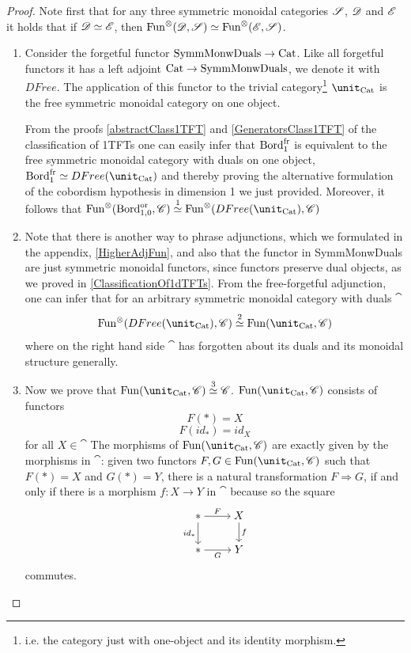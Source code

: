 \begin{proof}
	Note first that for any three symmetric monoidal categories $\mathscr{S}$, $\mathscr{D}$ and $\mathscr{E}$ it holds that if $\mathscr{D}\simeq\mathscr{E}$, then
	$\operatorname{Fun}^{\otimes}(\mathscr{D},\mathscr{S})\simeq\operatorname{Fun}^{\otimes}(\mathscr{E},\mathscr{S})$.
\begin{enumerate}
\item Consider the forgetful functor $\operatorname{SymmMonwDuals}\to\operatorname{Cat}$. Like all forgetful functors it has 
a left adjoint $\operatorname{Cat}\to\operatorname{SymmMonwDuals}$, we denote it with $DFree$.
The application of this functor to the trivial category\footnote{i.e. the category just with one-object and its
	identity morphism.} $\unit_{\Cat}$ is the free symmetric monoidal category on one object.

From the proofs \ref{abstractClass1TFT} and \ref{GeneratorsClass1TFT} of the classification of 1TFTs
one can easily infer that $\operatorname{Bord}_{1}^{\operatorname{fr}}$ is equivalent to the free symmetric monoidal category with duals
on one object,
$\Bord_{1}^{\fr}\simeq DFree(\unit_{\Cat})$
and thereby proving the alternative formulation of the cobordism hypothesis in dimension 1 we just provided. Moreover,
it follows that $\Fun^{\otimes}(\Bord_{1,0}^{\operatorname{or}},\cat)\overset{1}{\simeq}\Fun^{\otimes}(DFree(\unit_{\Cat}),\cat)$

\item Note that there is another way to phrase adjunctions, which we formulated in the appendix, \ref{HigherAdjFun}, and
also that the functor in SymmMonwDuals are just symmetric monoidal functors, since functors preserve dual
objects, as we proved in \ref{ClassificationOf1dTFTs}.
From the free-forgetful adjunction, one can infer that for an arbitrary symmetric monoidal category with duals $\cat$
$$\Fun^\otimes (DFree(\unit_{\Cat}),\cat)\overset{2}{\simeq}\Fun(\unit_{\Cat},\cat)$$
where on the right hand side $\cat$ has forgotten about its duals and its monoidal structure generally. 


\item Now we prove that $\Fun(\unit_{\Cat},\cat)\overset{3}{\simeq} \cat$.
$\Fun(\unit_{\Cat},\cat)$ consists of functors $$F(\ast)=X$$ $$F(id_\ast)=id_X$$ for all $X\in\cat$
The morphisms of $\Fun(\unit_{\Cat},\cat)$ are exactly given by the morphisms in $\cat$:  given two functors
 $F,G\in\Fun(\unit_{\Cat},\cat)$ such that $F(\ast)=X$ and $G(\ast)=Y$,
 there is a natural transformation $F\Rightarrow G$, if and only if
there is a morphism $f:X\to Y$ in $\cat$ because so the square 
\[\begin{tikzcd}[cramped]
	\ast & X \\
	\ast & Y
	\arrow["{id_\ast}"', from=1-1, to=2-1]
	\arrow["F", from=1-1, to=1-2]
	\arrow["G"', from=2-1, to=2-2]
	\arrow["f", from=1-2, to=2-2]
\end{tikzcd}\]
commutes.
\end{enumerate}
\end{proof}

